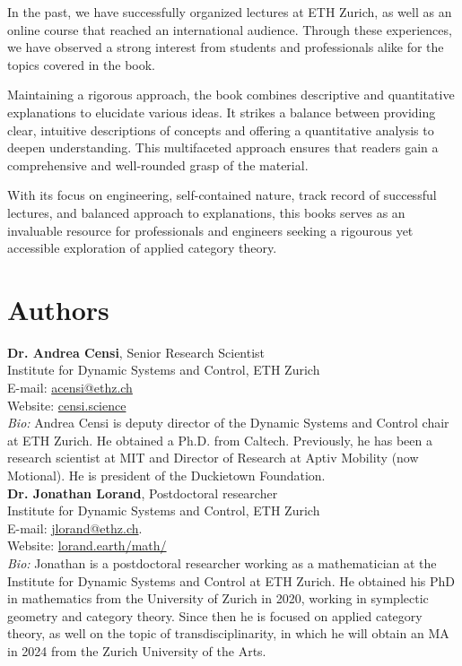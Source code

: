 \documentclass[10pt, article, one side]{memoir}
\begin{document}
    In the past, we have successfully organized lectures at ETH Zurich, as well as an online course that reached an international audience. Through these experiences, we have observed a strong interest from students and professionals alike for the topics covered in the book.

    Maintaining a rigorous approach, the book combines descriptive and quantitative explanations to elucidate various ideas.
    It strikes a balance between providing clear, intuitive descriptions of concepts and offering a quantitative analysis to deepen understanding.
    This multifaceted approach ensures that readers gain a comprehensive and well-rounded grasp of the material.

    With its focus on engineering, self-contained nature, track record of successful lectures, and balanced approach to explanations, this books serves as an invaluable resource for professionals and engineers seeking a rigourous yet accessible exploration of applied category theory.

    \section{Authors}
    \noindent \textbf{Dr.
        Andrea Censi}, Senior Research Scientist\\
    Institute for Dynamic Systems and Control, ETH Zurich\\
    E-mail: \href{mailto:acensi@ethz.ch}{acensi@ethz.ch}\\
    Website: \href{https://censi.science}{censi.science}\\
    \emph{Bio:} Andrea Censi is deputy director of the Dynamic Systems and Control chair at ETH Zurich.
    He obtained a Ph.D.
    from Caltech.
    Previously, he has been a research scientist at MIT and Director of Research at Aptiv Mobility (now Motional).
    He is president of the Duckietown Foundation.
    \\

    \noindent \textbf{Dr.
        Jonathan Lorand}, Postdoctoral researcher\\
    Institute for Dynamic Systems and Control, ETH Zurich\\
    E-mail: \href{mailto:jlorand@ethz.ch}{jlorand@ethz.ch}.
    \\
    Website: \href{http://lorand.earth/math/}{lorand.earth/math/}\\
    \emph{Bio:}
    Jonathan is a postdoctoral researcher working as a mathematician at the Institute for Dynamic Systems and Control at ETH Zurich.
    He obtained his PhD in mathematics from the University of Zurich in 2020, working in symplectic geometry and category theory.
    Since then he is focused on applied category theory, as well on the topic of transdisciplinarity, in which he will obtain an MA in 2024 from the Zurich University of the Arts.
    \\
\end{document}
